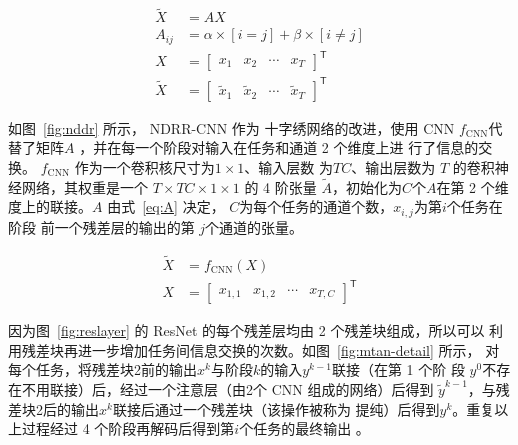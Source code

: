 \documentclass[../main]{subfiles}
\begin{document}
\begin{align}
  \tilde{X} & = AX \\
  \label{eq:A}
  A_{ij} & = \alpha \times [i = j] + \beta \times [i \neq j] \\
  X & = \begin{bmatrix}x_1 & x_2 & \cdots & x_T\end{bmatrix}^\mathsf{T} \\
  \tilde{X} & = \begin{bmatrix}
    \tilde{x}_1 & \tilde{x}_2 & \cdots & \tilde{x}_T
  \end{bmatrix}^\mathsf{T}
\end{align}

如图~\ref{fig:nddr} 所示， NDRR-CNN 作为 十字绣网络的改进，使用 CNN
$f_\mathrm{CNN}$代替了矩阵$A$ ，并在每一个阶段对输入在任务和通道 2 个维度上进
行了信息的交换。 $f_\mathrm{CNN}$ 作为一个卷积核尺寸为$1 \times 1$、输入层数
为$TC$、输出层数为 $T$ 的卷积神经网络，其权重是一个 $T \times TC \times 1
\times 1$ 的 4 阶张量 $\tilde{A}$，初始化为$C$个$A$在第 2 个维度上的联接。$A$
由式~\ref{eq:A} 决定， $C$为每个任务的通道个数，$x_{i, j}$为第$i$个任务在阶段
前一个残差层的输出的第 $j$个通道的张量。

\begin{align}
  \tilde{X} & = f_\mathrm{CNN}(X) \\
  X & = \begin{bmatrix}x_{1, 1} & x_{1, 2} & \cdots & x_{T, C}\end{bmatrix}^\mathsf{T}
\end{align}

因为图~\ref{fig:reslayer} 的 ResNet 的每个残差层均由 2 个残差块组成，所以可以
利用残差块再进一步增加任务间信息交换的次数。如图~\ref{fig:mtan-detail} 所示，
对每个任务，将残差块2前的输出$x^k$与阶段$k$的输入$y^{k - 1}$联接（在第 1 个阶
段 $y^0$不存在不用联接）后，经过一个注意层（由2个 CNN 组成的网络）后得到
$\tilde{y}^{k - 1}$，与残差块2后的输出$x^k$联接后通过一个残差块（该操作被称为
提纯）后得到$y^k$。重复以上过程经过 4 个阶段再解码后得到第$i$个任务的最终输出
。
\end{document}
